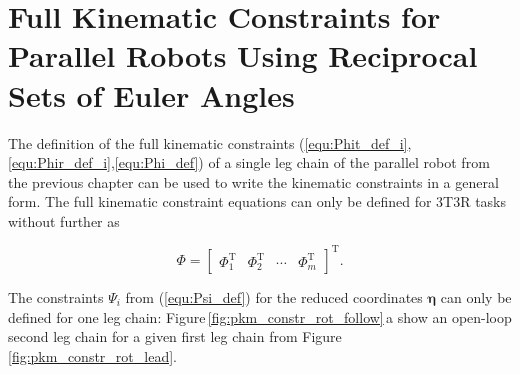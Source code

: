 \documentclass[robotics,article,accept,moreauthors,pdftex]{Definitions/mdpi}
\newcommand{\bm}[1]{\boldsymbol{#1}}
\newcommand{\transp}[0]{{\mathrm{T}}}
\let\Phi\varPhi
\let\Psi\varPsi
\begin{document}
\section{Full Kinematic Constraints for Parallel Robots Using Reciprocal Sets of Euler Angles}
\label{sec:ZB_PKM}

The definition of the full kinematic constraints (\ref{equ:Phit_def_i},\ref{equ:Phir_def_i},\ref{equ:Phi_def}) of a single leg chain of the parallel robot from the previous chapter can be used to write the kinematic constraints
in a general form.
%
The full kinematic constraint equations can only be defined for 3T3R tasks without further  as


\begin{equation}
\bm{\Phi}
=
\begin{bmatrix}
\bm{\Phi}_1^\transp &
\bm{\Phi}_2^\transp &
\cdots &
\bm{\Phi}_m^\transp
\end{bmatrix}^\transp.
\label{equ:constr_Phi_PKM}
\end{equation}
%

The constraints $\bm{\Psi}_i$ from (\ref{equ:Psi_def}) for the reduced coordinates $\bm{\eta}$ can only be defined for one leg chain:
Figure\,\ref{fig:pkm_constr_rot_follow}\,a show an open-loop second leg chain for a given first leg chain from Figure\,\ref{fig:pkm_constr_rot_lead}.
\end{document}
